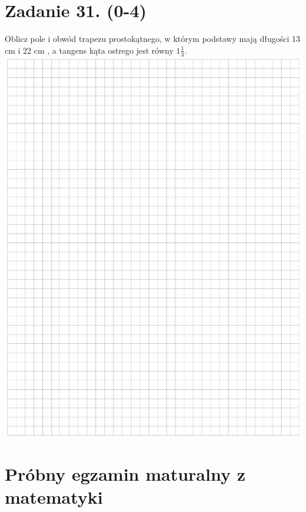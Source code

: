 \documentclass[10pt]{article}
\begin{document}
\section*{Zadanie 31. (0-4)}
Oblicz pole i obwód trapezu prostokątnego, w którym podstawy mają długości 13 cm i 22 cm , a tangens kąta ostrego jest równy \(1 \frac{1}{3}\).\\
\includegraphics[max width=\textwidth, center]{2024_11_21_94f02db55673a8a7b820g-17}

\section*{Próbny egzamin maturalny z matematyki}
\end{document}
